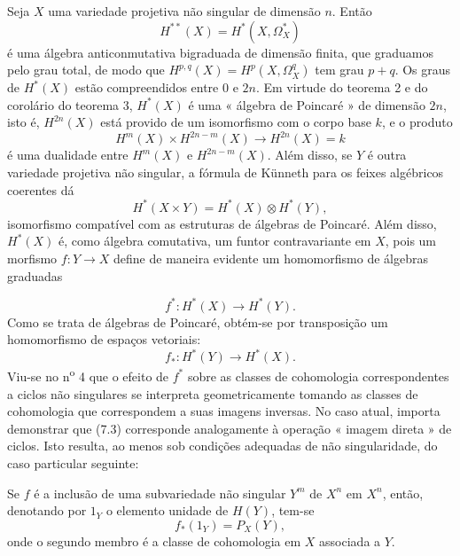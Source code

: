 
Seja $X$ uma variedade projetiva não singular de dimensão $n$. Então
\[
  H^{**}(X)=H^{*}(X,\Omega_X^{*})
\]
é uma álgebra anticonmutativa bigraduada de dimensão finita, que graduamos
pelo grau total, de modo que $H^{p,q}(X)=H^{p}(X,\Omega_X^{q})$ tem grau
$p+q$. Os graus de $H^{*}(X)$ estão compreendidos entre $0$ e $2n$. Em virtude do
teorema 2 e do corolário do teorema 3, $H^{*}(X)$ é uma « álgebra de
Poincaré » de dimensão $2n$, isto é, $H^{2n}(X)$ está provido de um isomorfismo com
o corpo base $k$, e o produto
\[
  H^{m}(X)\times H^{2n-m}(X)\longrightarrow H^{2n}(X)=k
\]
é uma dualidade entre $H^{m}(X)$ e $H^{2n-m}(X)$. Além disso, se $Y$ é outra
variedade projetiva não singular, a fórmula de Künneth para os
feixes algébricos coerentes dá
\begin{equation}\tag{7.1}
  H^{*}(X\times Y)=H^{*}(X)\otimes H^{*}(Y),
\end{equation}
isomorfismo compatível com as estruturas de álgebras de Poincaré. Além disso,
$H^{*}(X)$ é, como álgebra comutativa, um funtor contravariante em
$X$, pois um morfismo $f:Y\longrightarrow X$ define de maneira evidente um
homomorfismo de álgebras graduadas

\begin{equation}\tag{7.2}
  f^{*}:H^{*}(X)\longrightarrow H^{*}(Y).
\end{equation}
Como se trata de álgebras de Poincaré, obtém-se por transposição um
homomorfismo de espaços vetoriais:
\begin{equation}\tag{7.3}
  f_{*}:H^{*}(Y)\longrightarrow H^{*}(X).
\end{equation}
Viu-se no n\textsuperscript{o} 4 que o efeito de $f^{*}$ sobre as classes de
cohomologia correspondentes a ciclos não singulares se interpreta
geometricamente tomando as classes de cohomologia que correspondem a suas
imagens inversas. No caso atual, importa demonstrar que (7.3) corresponde
analogamente à operação « imagem direta » de ciclos. Isto resulta, ao menos sob
condições adequadas de não singularidade, do caso particular seguinte:

 Se $f$ é a inclusão de uma subvariedade não
singular $Y^{m}$ de $X^{n}$ em $X^{n}$, então, denotando por $1_Y$
o elemento unidade de $H(Y)$, tem-se
\begin{equation}\tag{7.4}
  f_{*}(1_Y)=P_X(Y),
\end{equation}
onde o segundo membro é a classe de cohomologia em $X$ associada a $Y$.

